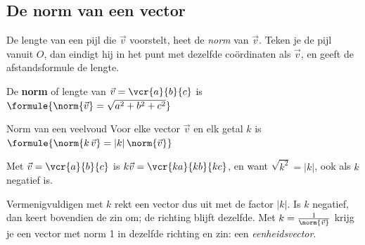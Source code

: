 
\begin{oefeningen}
\end{oefeningen}

\subsection{De norm van een vector}

De lengte van een pijl die $\vec v$ voorstelt, heet de \textit{norm} van $\vec v$. Teken je de pijl vanuit $O$, dan eindigt hij in het punt met dezelfde coördinaten als $\vec v$, en geeft de afstandsformule de lengte.

\begin{theorie}
De \textbf{\textcolor{accent}{norm}} of lengte van $\vec v = \vcr{a}{b}{c}$ is \quad $\formule{\norm{\vec v} = \sqrt{a^2 + b^2 + c^2}}$
\begin{stelling}{Norm van een veelvoud}
Voor elke vector $\vec v$ en elk getal $k$ is \quad $\formule{\norm{k\,\vec v} = |k|\,\norm{\vec v}}$
\end{stelling}
\begin{bewijs}
Met $\vec v = \vcr{a}{b}{c}$ is $k\vec v = \vcr{ka}{kb}{kc}$, en
want $\sqrt{k^2} = |k|$, ook als $k$ negatief is.
\end{bewijs}
\end{theorie}

Vermenigvuldigen met $k$ rekt een vector dus uit met de factor $|k|$. Is $k$ negatief, dan keert bovendien de zin om; de richting blijft dezelfde. Met $k = \frac{1}{\norm{\vec v}}$ krijg je een vector met norm 1 in dezelfde richting en zin: een \textit{eenheidsvector}.

